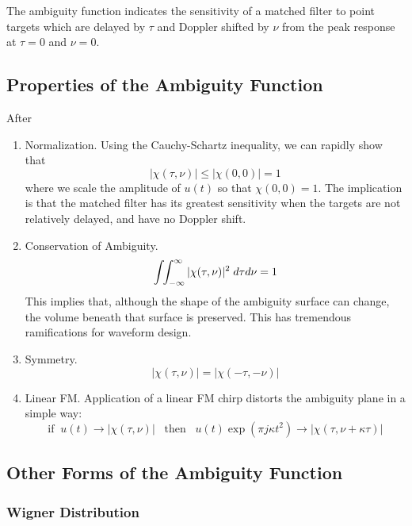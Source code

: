 The ambiguity function indicates the sensitivity of a matched filter
to point targets which are delayed by $\tau$ and Doppler shifted by
$\nu$ from the peak response at $\tau = 0$ and $\nu = 0$.

\subsection{Properties of the Ambiguity Function}

After \cite{levanon}

\begin{enumerate}
\item Normalization.  Using the Cauchy-Schartz inequality, we can
  rapidly show that 
\begin{equation} 
|\chi(\tau,\nu)| \le |\chi(0,0)| = 1
\end{equation}
where we scale the amplitude of $u(t)$ so that $\chi(0,0) = 1$.  The
implication is that the matched filter has its greatest sensitivity
when the targets are not relatively delayed, and have no Doppler
shift.
\item Conservation of Ambiguity.  
\begin{equation}
\int\!\!\int_{-\infty}^\infty |\chi(\tau,\nu)|^2 \; d\tau d\nu = 1
\end{equation}
This implies that, although the shape of the ambiguity surface can
change, the volume beneath that surface is preserved.  This has
tremendous ramifications for waveform design.
\item Symmetry.  
\begin{equation}
|\chi(\tau,\nu)| = |\chi(-\tau,-\nu)|
\end{equation}
\item Linear FM.  Application of a linear FM chirp distorts the
  ambiguity plane in a simple way:
\begin{equation}
\textrm{if}\;\; u(t) \rightarrow |\chi(\tau,\nu)| \;\;\; \textrm{then} \;\;\;
                u(t) \exp(\pi j \kappa t^2) \rightarrow |\chi(\tau,
                \nu + \kappa \tau)|
\end{equation}

\end{enumerate}

\subsection{Other Forms of the Ambiguity Function}

\subsubsection{Wigner Distribution}


